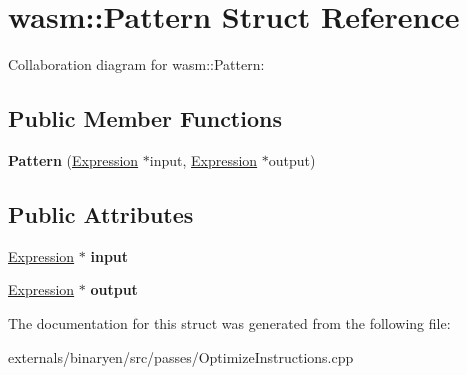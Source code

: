 \hypertarget{structwasm_1_1_pattern}{}\section{wasm\+:\+:Pattern Struct Reference}
\label{structwasm_1_1_pattern}


Collaboration diagram for wasm\+:\+:Pattern\+:
\subsection*{Public Member Functions}
\begin{DoxyCompactItemize}
\item 
\mbox{\label{structwasm_1_1_pattern_a835107a80d7be418da75c5c1975c309b}} 
{\bfseries Pattern} (\mbox{\hyperlink{classwasm_1_1_expression}{Expression}} $\ast$input, \mbox{\hyperlink{classwasm_1_1_expression}{Expression}} $\ast$output)
\end{DoxyCompactItemize}
\subsection*{Public Attributes}
\begin{DoxyCompactItemize}
\item 
\mbox{\label{structwasm_1_1_pattern_a0e42aa166f4836f98824a7f3f2cc3b2a}} 
\mbox{\hyperlink{classwasm_1_1_expression}{Expression}} $\ast$ {\bfseries input}
\item 
\mbox{\label{structwasm_1_1_pattern_aaabad6d45fd4bc6f14fe1ccc4e661936}} 
\mbox{\hyperlink{classwasm_1_1_expression}{Expression}} $\ast$ {\bfseries output}
\end{DoxyCompactItemize}


The documentation for this struct was generated from the following file\+:\begin{DoxyCompactItemize}
\item 
externals/binaryen/src/passes/Optimize\+Instructions.\+cpp\end{DoxyCompactItemize}
